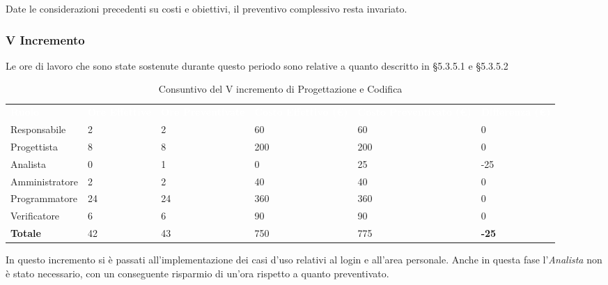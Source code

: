 Date le considerazioni precedenti su costi e obiettivi, il preventivo complessivo resta invariato.


\pagebreak


\subsubsection{V Incremento}
Le ore di lavoro che sono state sostenute durante questo periodo sono relative a quanto descritto in §5.3.5.1 e §5.3.5.2

\begin{table}[H]
\begin{center}
\renewcommand{\arraystretch}{1.5}
\begin{tabular}{ m{}<{\centering}  m{}<{\centering} m{}<{\centering} m{}<{\centering} m{}<{\centering} m{}<{\centering}}	\rowcolor{darkblue}
	\textcolor{white}{\textbf{Ruolo}} & \textcolor{white}{\textbf{Ore Effettive}} & \textcolor{white}{\textbf{Ore Preventivate}}&\textcolor{white}{\textbf{Costo Effettivo (\euro)}}&\textcolor{white}{\textbf{Costo Preventivato (\euro)}}&\textcolor{white}{\textbf{Differenza (\euro)}}\\ 

	Responsabile & 2 & 2 & 60 & 60 & 0\\	
	
	Progettista & 8 & 8 & 200 & 200 & 0\\
	
	Analista & 0 & 1 & 0 & 25 & -25\\
	
	Amministratore & 2 & 2 & 40 & 40 & 0\\
	
	Programmatore & 24 & 24 & 360 & 360 & 0\\
	
	Verificatore & 6 & 6 & 90 & 90 & 0\\
	
	\textbf{Totale} & 42 & 43 & 750 & 775 & \textbf{-25} \\
	
\end{tabular}
\caption{Consuntivo del V incremento di Progettazione e Codifica}
\end{center}
\end{table}

In questo incremento si è passati all'implementazione dei casi d'uso relativi al login e all'area personale. Anche in questa fase l'\textit{Analista} non è stato necessario, con un conseguente risparmio di un'ora rispetto a quanto preventivato. 

